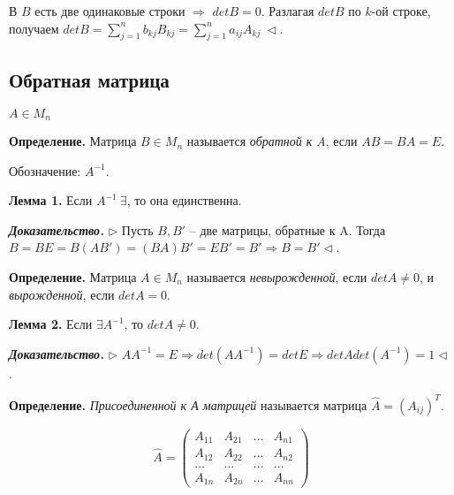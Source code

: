 В $B$ есть две одинаковые строки $\Rightarrow$ $detB = 0$. Разлагая $detB$ по $k$-ой строке, получаем $detB = \sum\limits_{j = 1}^n b_{kj}B_{kj} = \sum\limits_{j = 1}^n a_{ij}A_{kj} \ \lhd$.

\vspace{\baselineskip}
\subsection{Обратная матрица}

$A \in M_n$

\vspace{\baselineskip}
\textbf{Определение.} Матрица $B \in M_n$ называется \textit{обратной к A}, если $AB = BA = E$.

Обозначение: $A^{-1}$.

\vspace{\baselineskip}
\textbf{Лемма 1.} Если $A^{-1} \ \exists$, то она единственна.

\vspace{\baselineskip}
\textbf{\textit{Доказательство.}} $\rhd$ Пусть $B, B'$ -- две матрицы, обратные к A. Тогда $B = BE = B(AB') = (BA)B' = EB' = B' \Rightarrow B = B' \lhd$.

\vspace{\baselineskip}
\textbf{Определение.} Матрица $A \in M_n$ называется \textit{невырожденной}, если $detA \neq 0$, и \textit{вырожденной}, если $detA = 0$.

\vspace{\baselineskip}
\textbf{Лемма 2.} Если $\exists A^{-1}$, то $detA \neq 0$.

\vspace{\baselineskip}
\textbf{\textit{Доказательство.}} $\rhd$ $AA^{-1} = E \Rightarrow det(AA^{-1}) = detE \Rightarrow detA det(A^{-1}) = 1 \lhd$.

\vspace{\baselineskip}
\textbf{Определение.} \textit{Присоединенной к А матрицей} называется матрица $\widehat{A} = (A_{ij})^T$.

\vspace{\baselineskip}
\begin{equation*}\widehat{A} = \begin{pmatrix} A_{11} & A_{21} & \dots & A_{n1} \\ A_{12} & A_{22} & \dots & A_{n2} \\ \dots & \dots & \dots & \dots \\ A_{1n} & A_{2n} & \dots & A_{nn} \end{pmatrix}
\end{equation*}

